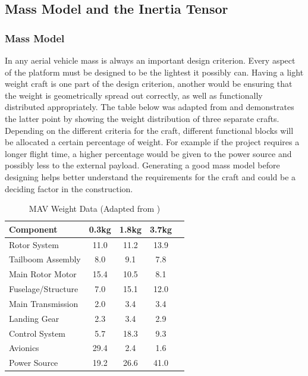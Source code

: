 	
	\subsection{Mass Model and the Inertia Tensor}
		\subsubsection{Mass Model}
		In any aerial vehicle mass is always an important design criterion. Every aspect of the platform must be designed to be the lightest it possibly can. Having a light weight craft is one part of the design criterion, another would be ensuring that the weight is geometrically spread out correctly, as well as functionally distributed appropriately. The table below was adapted from \cite{NewMAV} and demonstrates the latter point by showing the weight distribution of three separate crafts. Depending on the different criteria for the craft, different functional blocks will be allocated a certain percentage of weight. For example if the project requires a longer flight time, a higher percentage would be given to the power source and possibly less to the external payload. Generating a good mass model before designing helps better understand the requirements for the craft and could be a deciding factor in the construction.
		
		\begin{table}[H]
			\centering
			\begin{tabular}{l | c | c | c | c}
				
				Component 					& 0.3kg & 1.8kg & 3.7kg\\
				\hline\hline
				Rotor System 				& 11.0 & 11.2 & 13.9\\
				Tailboom Assembly 			& 8.0 & 9.1 & 7.8\\
				Main Rotor Motor 			& 15.4 & 10.5 & 8.1\\
				Fuselage/Structure 			& 7.0 &  15.1 & 12.0\\
				Main Transmission 			& 2.0 &  3.4 & 3.4\\
				Landing Gear 				& 2.3 &  3.4 & 2.9\\
				Control System 				& 5.7 & 18.3 & 9.3\\
				Avionics 						& 29.4 &  2.4 & 1.6\\
				Power Source 				& 19.2 & 26.6 & 41.0\\
				
			\end{tabular}
			\caption{MAV Weight Data (Adapted from \cite{NewMAV})}
		\end{table}
	

